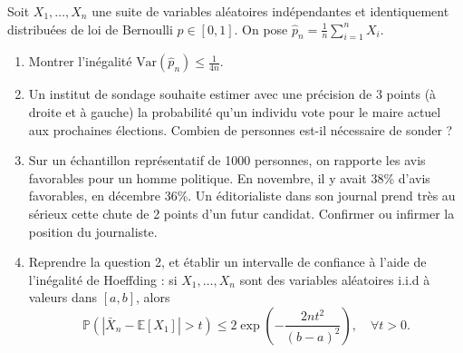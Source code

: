 \begin{mdframed}
\begin{exercice}
Soit $X_1, \dots, X_n$ une suite de variables aléatoires indépendantes et identiquement distribuées de loi de Bernoulli $p \in [0, 1]$. On pose $\hat{p}_n = \frac{1}{n} \sum_{i=1}^n X_i$.

\begin{enumerate}
    \item Montrer l'inégalité $\text{Var}(\hat{p}_n) \le \frac{1}{4n}$.
    \item Un institut de sondage souhaite estimer avec une précision de 3 points (à droite et à gauche) la probabilité qu'un individu vote pour le maire actuel aux prochaines élections. Combien de personnes est-il nécessaire de sonder ?
    \item Sur un échantillon représentatif de 1000 personnes, on rapporte les avis favorables pour un homme politique. En novembre, il y avait 38\% d'avis favorables, en décembre 36\%. Un éditorialiste dans son journal prend très au sérieux cette chute de 2 points d'un futur candidat. Confirmer ou infirmer la position du journaliste.
    \item Reprendre la question 2, et établir un intervalle de confiance à l'aide de l'inégalité de Hoeffding : si $X_1, \dots, X_n$ sont des variables aléatoires i.i.d à valeurs dans $[a, b]$, alors
    \begin{equation}
    \mathbb{P}(|\bar{X}_n - \mathbb{E}[X_1]| > t) \le 2 \exp \left( -\frac{2nt^2}{(b - a)^2} \right), \quad \forall t > 0.
    \end{equation}
\end{enumerate}
\end{exercice}
\end{mdframed}

\smallskip


